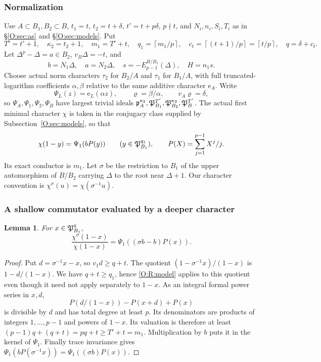 \documentclass[11pt]{amsart}
\newtheorem{lemma}[theorem]{Lemma}
\theoremstyle{definition}
\theoremstyle{remark}
\newcommand{\ceil}[1]{\left\lceil #1\right\rceil}
\begin{document}
\subsubsection*{Normalization}
Use $A\subset B_1,B_2\subset B$, $t_1=t$, $t_2=t+\delta$, $t'=t+p\delta$,
$p\nmid t$, and $N_i,n_i,S_i,T_i$ as in \S\ref{O:sec:as} and \S\ref{O:sec:models}. Put
\[
 T'=t'+1,\quad \kappa_2=t_2+1,\quad m_1=T'+t,\quad q_1=\ceil{m_1/p},
 \quad c_t=\ceil{(t+1)/p}=\ceil{t/p},\quad q=\delta+c_t.
\]
Let $\Delta^p-\Delta=a\in B_2$, $v_B\Delta=-t$, and
\[
 b=N_1\Delta,\quad a=N_2\Delta,\quad
 s=-E_{p-1}^{B/B_1}(\Delta),\quad H=n_1s.
\]
Choose actual norm characters $\tau_2$ for $B_2/A$ and $\tau_1$ for $B_1/A$,
with full truncated-logarithm coefficients $\alpha,\beta$ relative to the
same additive character $\mathrm e_A$. Write
\[
 \Psi_L(z)=\mathrm e_L(\alpha z),\qquad \varrho=\beta/\alpha,
 \qquad v_A \varrho=\delta,
\]
so $\Psi_A,\Psi_1,\Psi_2,\Psi_B$ have largest trivial ideals
$\mathfrak p_A^{\kappa_2},\mathfrak P_{B_1}^{T'},\mathfrak P_{B_2}^{\kappa_2},\mathfrak P_B^{T'}$.
The actual first minimal character $\chi$ is taken in the conjugacy class
supplied by Subsection~\ref{O:sec:models}, so that
\begin{equation}\label{O:R:model}
 \chi(1-y)=\Psi_1(bP(y))\qquad(y\in\mathfrak P_{B_1}^{q_1}),\qquad
 P(X)=\sum_{j=1}^{p-1}X^j/j.
\end{equation}
Its exact conductor is $m_1$. Let $\sigma$ be the restriction to $B_1$ of the
upper automorphism of $B/B_2$ carrying $\Delta$ to the root near $\Delta+1$.
Our character convention is $\chi^\sigma(u)=\chi(\sigma^{-1}u)$.

\subsubsection*{A shallow commutator evaluated by a deeper character}
\begin{lemma}\label{O:R:comm-log}
For $x\in\mathfrak P_{B_1}^{q}$,
\[
 \frac{\chi^\sigma(1-x)}{\chi(1-x)}
       =\Psi_1((\sigma b-b)P(x)).
\]
\end{lemma}
\begin{proof}
Put $d=\sigma^{-1}x-x$, so $v_1d\ge q+t$.
The quotient $(1-\sigma^{-1}x)/(1-x)$ is $1-d/(1-x)$.
We have $q+t\ge q_1$, hence \eqref{O:R:model} applies to this quotient even
though it need not apply separately to $1-x$.
As an integral formal power series in $x,d$,
\[
 P(d/(1-x))-P(x+d)+P(x)
\]
is divisible by $d$ and has total degree at least $p$. Its denominators
are products of integers $1,\ldots,p-1$ and powers of $1-x$.
Its valuation is therefore at least $(p-1)q+(q+t)=pq+t\ge T'+t=m_1$.
Multiplication by $b$ puts it in the kernel of $\Psi_1$.
Finally trace invariance gives
$\Psi_1(bP(\sigma^{-1}x))=\Psi_1((\sigma b)P(x))$.
\end{proof}
\end{document}

